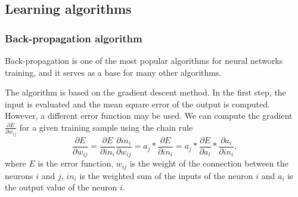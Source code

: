 \subsection{Learning algorithms}

\subsubsection{Back-propagation algorithm}
Back-propagation is one of the most popular algorithms for neural networks training, and it serves as a base for many other algorithms.

The algorithm is based on the gradient descent method. In the first step, the input is evaluated and the mean square error of the output is computed. However, a different error function may be used. We can compute the gradient $\frac{\partial E}{\partial w_{ij}}$ for a given training sample using the chain rule
\[
\frac{\partial E}{\partial w_{ij}} = \frac{\partial E}{\partial in_{i}} \frac{\partial in_{i}}{\partial w_{ij}} = 
a_{j}*\frac{\partial E}{\partial in_{i}} = a_{j}*\frac{\partial E}{\partial a_{i}}*\frac{\partial a_{i}}{\partial in_{i}},
\]
where $E$ is the error function, $w_{ij}$ is the weight of the connection between the neurons $i$ and $j$, $in_{i}$ is the weighted sum of the inputs of the neuron $i$ and $a_{i}$ is the output value of the neuron $i$.

